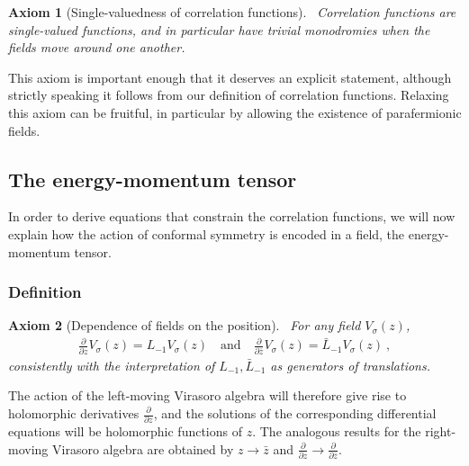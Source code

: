 \documentclass[12pt, a4paper, notitlepage, twoside]{report}
\numberwithin{equation}{section}
\theoremstyle{break}
\newtheorem{hyp}{Axiom}[chapter]
\begin{document}
\begin{hyp}[Single-valuedness of correlation functions]
 ~\label{ax:svcf}
 Correlation functions are single-valued functions, and in particular have trivial monodromies when the fields move around one another.
\end{hyp}
\noindent
This axiom is important enough that it deserves an explicit statement, although strictly speaking it follows from our definition of correlation functions.
Relaxing this axiom can be fruitful, in particular by allowing the existence of parafermionic fields.


\subsection{The energy-momentum tensor \label{secem}}

In order to derive equations that constrain the correlation functions, we will now explain how the action of conformal symmetry is encoded in a field, the energy-momentum tensor.

\subsubsection{Definition}

\begin{hyp}[Dependence of fields on the position]
 ~\label{ax:dvz}
 For any field $V_\sigma(z)$,
 \begin{align}
 \boxed{{\frac{\partial}{\partial z} V_\sigma(z)} = L_{-1} V_\sigma (z) }  \quad \text{and} \quad {\frac{\partial}{\partial \bar z} V_\sigma(z)} = \bar L_{-1} V_\sigma (z)\ ,
\label{lvpv}
\end{align}
consistently with the interpretation of $L_{-1},\bar L_{-1}$ as generators of translations. 
\end{hyp}
\noindent
The action of the left-moving Virasoro algebra will therefore give rise to holomorphic derivatives $\frac{\partial}{\partial z}$, and the solutions of the corresponding differential equations will be holomorphic functions of $z$. The analogous results for the right-moving Virasoro algebra are obtained by $z\to \bar z$ and $\frac{\partial}{\partial z} \to \frac{\partial}{\partial \bar z}$. 
\end{document}
